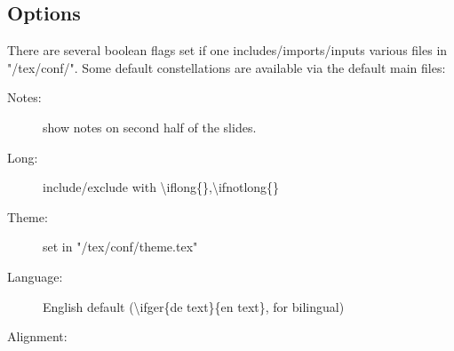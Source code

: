 \subsection{Options}
\begin{iframe}
There are several boolean flags set if one includes/imports/inputs various files in "/tex/conf/". Some default constellations are available via the default main files:

\begin{description}
\item[Notes:] show notes on second half of the slides.
\item[Long:] include/exclude with \textbackslash iflong\{\},\textbackslash ifnotlong\{\}
\item[Theme:] set in "/tex/conf/theme.tex"
\item[Language:] English default (\textbackslash ifger\{de text\}\{en text\}, for bilingual)
\item[Alignment:] 
\end{description}
\end{iframe}